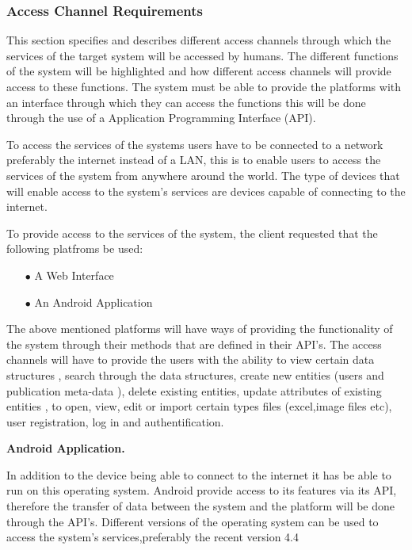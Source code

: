\documentclass[a4paper,12pt]{article}
\begin{document}
\subsubsection{Access Channel Requirements}
\begin{flushleft}

This section specifies and describes different access channels through which the services of the target system will be accessed by humans. The different functions of the system will be highlighted and how different access channels will provide access to these functions. The system must be able to provide the platforms with an interface through which they can access the functions this will be done through the use of a Application Programming  Interface (API).

To access the services of the systems users have to be connected to a network preferably the internet instead of a LAN, this is to enable users to access the services of the system from anywhere around the world. The type of devices that will enable access to the system's services are devices capable of connecting to the internet.

To provide access to the services of the system, the client requested that the following platfroms
be used:

\begin{itemize}
\item[$\bullet$]A Web Interface
\item[$\bullet$]An Android Application
\\
\end{itemize}
 
The above mentioned platforms will have ways of providing the functionality of the system through their methods that are defined in their API's. The access channels will have to provide the users with the ability to view certain data structures , search through the data structures, create new entities (users and publication meta-data ), delete existing entities, update attributes of existing entities , to open, view, edit or import certain types files (excel,image files etc), user registration, log in and authentification.

\textbf{Android Application.}

In addition to the device being able to connect to the internet it has be able to run on this operating system. Android provide access to its features via its API, therefore the transfer of data between the system and the platform will be done through the API's. Different versions of the operating system can be used to access the system's services,preferably the recent version 4.4


\end{flushleft}
\end{document}
